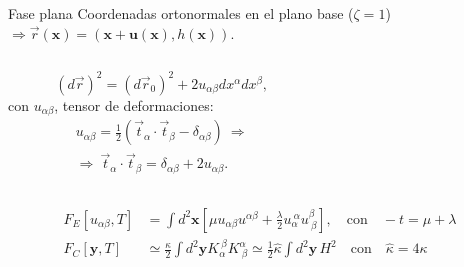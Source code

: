\documentclass[xcolor=dvipsnames]{beamer}
\begin{document}
\begin{frame}{Fase plana}
Coordenadas ortonormales en el plano base ($\zeta=1$) $\Rightarrow\vec{r}(\mathbf{x})=(\mathbf{x}+\mathbf{u(\mathbf{x})},h(\mathbf{x}))$.
  \begin{columns}[T]
    \begin{column}{5.8cm}
      \centering
      \begin{equation*}
        (d\vec{r})^2=(d\vec{r}_0)^2+2u_{\alpha\beta}dx^{\alpha}dx^{\beta},
      \end{equation*}
      con $u_{\alpha\beta}$, tensor de deformaciones:
      \begin{multline*}
        u_{\alpha\beta}=\frac{1}{2}(\vec{t}_{\alpha}\cdot\vec{t}_{\beta}-\delta_{\alpha\beta})\
        \Rightarrow\\\Rightarrow \
        \vec{t}_{\alpha}\cdot\vec{t}_{\beta}=\delta_{\alpha\beta}+2u_{\alpha\beta}.
      \end{multline*}     
    \end{column}
    \begin{column}{5.8cm}
      \centering
      \begin{figure}[h]
        \resizebox{\columnwidth}{!}{}
      \end{figure} 
    \end{column}
  \end{columns}
  
  \begin{align*}
    F_E[u_{\alpha\beta},T]&=\int d^2\mathbf{x}
    \left[
      \mu u_{\alpha\beta}u^{\alpha\beta}\! +\!
      \frac{\lambda}{2}u_{\alpha}^{\ \alpha}u^{\beta}_{\ \beta}\right],
    \quad\text{con}\quad -t=\mu+\lambda\\
    F_C[\mathbf{y},T]&\simeq\frac{\kappa}{2}\int d^2\mathbf{y} K_{\alpha}^{\
      \beta}K^{\alpha}_{\ \beta}\simeq \frac{1}{2}\hat{\kappa}\int d^2\mathbf{y}\, H^2 \quad
\text{con} \quad \hat{\kappa}=4\kappa
  \end{align*}
\end{frame}
\end{document}
